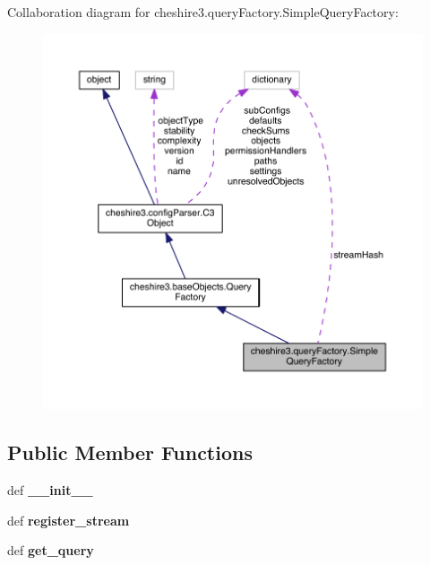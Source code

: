 Collaboration diagram for cheshire3.\-query\-Factory.\-Simple\-Query\-Factory\-:
\nopagebreak
\begin{figure}[H]
\begin{center}
\leavevmode
\includegraphics[width=350pt]{classcheshire3_1_1query_factory_1_1_simple_query_factory__coll__graph}
\end{center}
\end{figure}
\subsection*{Public Member Functions}
\begin{DoxyCompactItemize}
\item 
\hypertarget{classcheshire3_1_1query_factory_1_1_simple_query_factory_a4d4bdf986267073713c72e7a51e91f4b}{def {\bfseries \-\_\-\-\_\-init\-\_\-\-\_\-}}\label{classcheshire3_1_1query_factory_1_1_simple_query_factory_a4d4bdf986267073713c72e7a51e91f4b}

\item 
\hypertarget{classcheshire3_1_1query_factory_1_1_simple_query_factory_a637f91aac2387200a88354c08d5933be}{def {\bfseries register\-\_\-stream}}\label{classcheshire3_1_1query_factory_1_1_simple_query_factory_a637f91aac2387200a88354c08d5933be}

\item 
\hypertarget{classcheshire3_1_1query_factory_1_1_simple_query_factory_a566c9c968ec4782be35096c87536bf0f}{def {\bfseries get\-\_\-query}}\label{classcheshire3_1_1query_factory_1_1_simple_query_factory_a566c9c968ec4782be35096c87536bf0f}

\end{DoxyCompactItemize}
